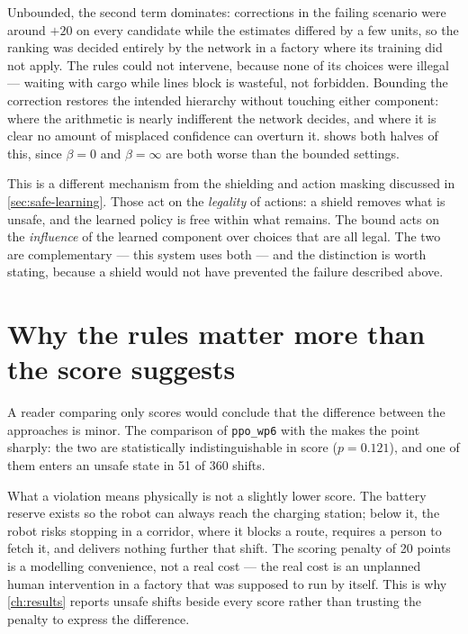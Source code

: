 Unbounded, the second term dominates: corrections in the failing scenario were around $+20$ on
every candidate while the estimates differed by a few units, so the ranking was decided entirely by
the network in a factory where its training did not apply. The rules could not intervene, because
none of its choices were illegal --- waiting with cargo while lines block is wasteful, not
forbidden. Bounding the correction restores the intended hierarchy without touching either
component: where the arithmetic is nearly indifferent the network decides, and where it is clear no
amount of misplaced confidence can overturn it.  shows both halves of this,
since $\beta=0$ and $\beta=\infty$ are both worse than the bounded settings.

This is a different mechanism from the shielding and action masking discussed in
\cref{sec:safe-learning}. Those act on the \emph{legality} of actions: a shield removes what is
unsafe, and the learned policy is free within what remains. The bound acts on the \emph{influence}
of the learned component over choices that are all legal. The two are complementary --- this system
uses both --- and the distinction is worth stating, because a shield would not have prevented the
failure described above.

\section{Why the rules matter more than the score suggests}
\label{sec:rules-matter}

A reader comparing only scores would conclude that the difference between the approaches is minor.
The comparison of \texttt{ppo\_wp6} with the \NS makes the point sharply: the two are
statistically indistinguishable in score ($p=0.121$), and one of them enters an unsafe state in
\num{51} of \num{360} shifts.

What a violation means physically is not a slightly lower score. The battery reserve exists so the
robot can always reach the charging station; below it, the robot risks stopping in a corridor,
where it blocks a route, requires a person to fetch it, and delivers nothing further that shift.
The scoring penalty of \num{20} points is a modelling convenience, not a real cost --- the real
cost is an unplanned human intervention in a factory that was supposed to run by itself. This is
why \cref{ch:results} reports unsafe shifts beside every score rather than trusting the penalty to
express the difference.

